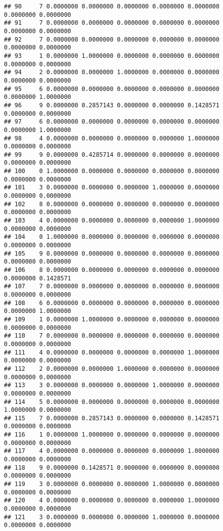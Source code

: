 \documentclass[
]{article}
\begin{document}
\begin{verbatim}
## 90     7 0.0000000 0.0000000 0.0000000 0.0000000 0.0000000 0.0000000 0.0000000
## 91     7 0.0000000 0.0000000 0.0000000 0.0000000 0.0000000 0.0000000 0.0000000
## 92     7 0.0000000 0.0000000 0.0000000 0.0000000 0.0000000 0.0000000 0.0000000
## 93     1 0.0000000 1.0000000 0.0000000 0.0000000 0.0000000 0.0000000 0.0000000
## 94     2 0.0000000 0.0000000 1.0000000 0.0000000 0.0000000 0.0000000 0.0000000
## 95     6 0.0000000 0.0000000 0.0000000 0.0000000 0.0000000 0.0000000 1.0000000
## 96     9 0.0000000 0.2857143 0.0000000 0.0000000 0.1428571 0.0000000 0.0000000
## 97     6 0.0000000 0.0000000 0.0000000 0.0000000 0.0000000 0.0000000 1.0000000
## 98     4 0.0000000 0.0000000 0.0000000 0.0000000 1.0000000 0.0000000 0.0000000
## 99     9 0.0000000 0.4285714 0.0000000 0.0000000 0.0000000 0.0000000 0.0000000
## 100    0 1.0000000 0.0000000 0.0000000 0.0000000 0.0000000 0.0000000 0.0000000
## 101    3 0.0000000 0.0000000 0.0000000 1.0000000 0.0000000 0.0000000 0.0000000
## 102    8 0.0000000 0.0000000 0.0000000 0.0000000 0.0000000 0.0000000 0.0000000
## 103    4 0.0000000 0.0000000 0.0000000 0.0000000 1.0000000 0.0000000 0.0000000
## 104    0 1.0000000 0.0000000 0.0000000 0.0000000 0.0000000 0.0000000 0.0000000
## 105    9 0.0000000 0.0000000 0.0000000 0.0000000 0.0000000 0.0000000 0.0000000
## 106    8 0.0000000 0.0000000 0.0000000 0.0000000 0.0000000 0.0000000 0.1428571
## 107    7 0.0000000 0.0000000 0.0000000 0.0000000 0.0000000 0.0000000 0.0000000
## 108    6 0.0000000 0.0000000 0.0000000 0.0000000 0.0000000 0.0000000 1.0000000
## 109    1 0.0000000 1.0000000 0.0000000 0.0000000 0.0000000 0.0000000 0.0000000
## 110    7 0.0000000 0.0000000 0.0000000 0.0000000 0.0000000 0.0000000 0.0000000
## 111    4 0.0000000 0.0000000 0.0000000 0.0000000 1.0000000 0.0000000 0.0000000
## 112    2 0.0000000 0.0000000 1.0000000 0.0000000 0.0000000 0.0000000 0.0000000
## 113    3 0.0000000 0.0000000 0.0000000 1.0000000 0.0000000 0.0000000 0.0000000
## 114    5 0.0000000 0.0000000 0.0000000 0.0000000 0.0000000 1.0000000 0.0000000
## 115    7 0.0000000 0.2857143 0.0000000 0.0000000 0.1428571 0.0000000 0.0000000
## 116    1 0.0000000 1.0000000 0.0000000 0.0000000 0.0000000 0.0000000 0.0000000
## 117    4 0.0000000 0.0000000 0.0000000 0.0000000 1.0000000 0.0000000 0.0000000
## 118    9 0.0000000 0.1428571 0.0000000 0.0000000 0.0000000 0.0000000 0.0000000
## 119    3 0.0000000 0.0000000 0.0000000 1.0000000 0.0000000 0.0000000 0.0000000
## 120    4 0.0000000 0.0000000 0.0000000 0.0000000 1.0000000 0.0000000 0.0000000
## 121    3 0.0000000 0.0000000 0.0000000 1.0000000 0.0000000 0.0000000 0.0000000

\end{verbatim}
\end{document}
